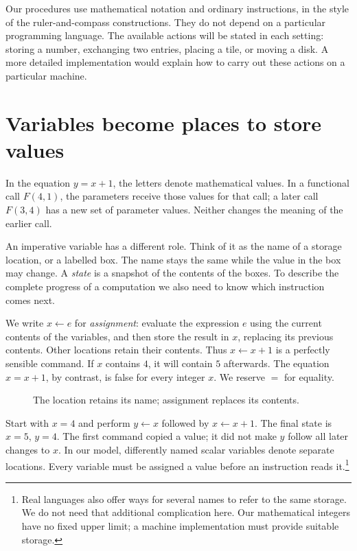 Our procedures use mathematical notation and ordinary instructions, in the
style of the ruler-and-compass constructions. They do not depend on a
particular programming language. The available actions will be stated in
each setting: storing a number, exchanging two entries, placing a tile, or
moving a disk. A more detailed implementation would explain how to carry
out these actions on a particular machine.

\section{Variables become places to store values}

In the equation $y=x+1$, the letters denote mathematical values. In a
functional call $F(4,1)$, the parameters receive those values for that call;
a later call $F(3,4)$ has a new set of parameter values. Neither changes
the meaning of the earlier call.

An imperative variable has a different role. Think of it as the name of a
storage location, or a labelled box. The name stays the same while the
value in the box may change. A \emph{state} is a snapshot of the contents
of the boxes. To describe the complete progress of a computation we also
need to know which instruction comes next.

We write $x\leftarrow e$ for \emph{assignment}: evaluate the expression
$e$ using the current contents of the variables, and then store the result
in $x$, replacing its previous contents. Other locations retain their
contents. Thus $x\leftarrow x+1$ is a perfectly sensible command. If $x$
contains $4$, it will contain $5$ afterwards. The equation $x=x+1$, by
contrast, is false for every integer $x$. We reserve $=$ for equality.

\begin{figure}[ht]
\centering
{}
\caption{The location retains its name; assignment replaces its contents.}
\end{figure}

Start with $x=4$ and perform $y\leftarrow x$ followed by $x\leftarrow x+1$.
The final state is $x=5$, $y=4$. The first command copied a value; it did
not make $y$ follow all later changes to $x$. In our model, differently
named scalar variables denote separate locations. Every variable must be
assigned a value before an instruction reads it.\footnote{Real languages
also offer ways for several names to refer to the same storage. We do not
need that additional complication here. Our mathematical integers have no
fixed upper limit; a machine implementation must provide suitable storage.}

